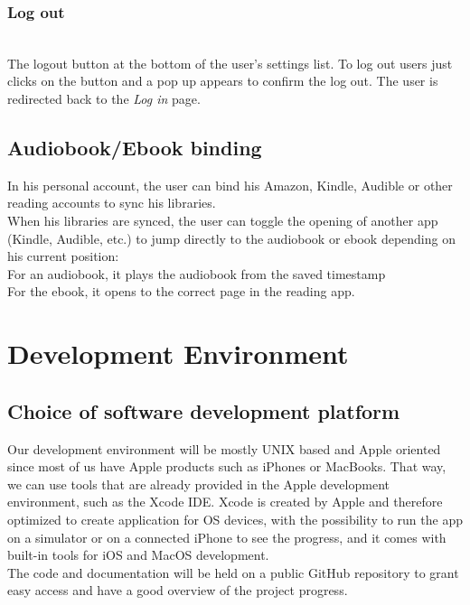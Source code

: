\documentclass[conference]{IEEEtran}
\begin{document}
\subsubsection{Log out}\hfill\\
The logout button at the bottom of the user's settings list. To log out users just clicks on the button and a pop up appears to confirm the log out. The user is redirected back to the \textit{Log in} page.\\


\subsection{Audiobook/Ebook binding}
In his personal account, the user can bind his Amazon, Kindle, Audible or other reading accounts to sync his libraries.\\
When his libraries are synced, the user can toggle the opening of another app (Kindle, Audible, etc.) to jump directly to the audiobook or ebook depending on his current position:\\
For an audiobook, it plays the audiobook from the saved timestamp\\
For the ebook, it opens to the correct page in the reading app.\\


\section{Development Environment} 
\subsection{Choice of software development platform}

Our development environment will be mostly UNIX based and Apple oriented since most of us have Apple products such as iPhones or MacBooks. That way, we can use tools that are already provided in the Apple development environment, such as the Xcode IDE. Xcode is created by Apple and therefore optimized to create application for OS devices, with the possibility to run the app on a simulator or on a connected iPhone to see the progress, and it comes with built-in tools for iOS and MacOS development.\\
The code and documentation will be held on a public GitHub repository to grant easy access and have a good overview of the project progress.\\ 
\end{document}
